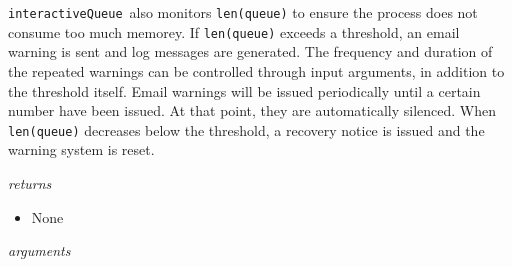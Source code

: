 \documentclass{article}
\newcommand{\interactiveQueue}{\texttt{interactiveQueue}}
\begin{document}
\interactiveQueue~also monitors \texttt{len(queue)} to ensure the process does not consume too much memorey.
If \texttt{len(queue)} exceeds a threshold, an email warning is sent and log messages are generated. 
The frequency and duration of the repeated warnings can be controlled through input arguments, in addition to the threshold itself.
Email warnings will be issued periodically until a certain number have been issued.
At that point, they are automatically silenced.
When \texttt{len(queue)} decreases below the threshold, a recovery notice is issued and the warning system is reset.

\vspace{0.5cm}
\noindent
\textit{returns}

\begin{itemize}
    \item{None}
\end{itemize}

\noindent
\textit{arguments}
\end{document}
